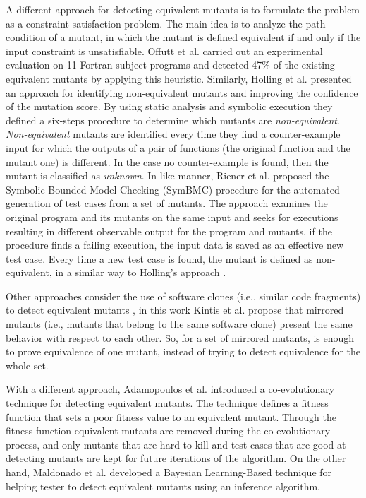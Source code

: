 A different approach for detecting equivalent mutants is to formulate the problem as a constraint satisfaction problem. The main idea is to analyze the path condition of a mutant, in which the mutant is defined equivalent if and only if the input constraint is unsatisfiable. Offutt et al. \cite{offutt1996detecting,offutt1997automatically} carried out an experimental evaluation on 11 Fortran subject programs and detected 47\% of the existing equivalent mutants by applying this heuristic.
Similarly, Holling et al. \cite{holling2016nequivack,papadakis2012mutation} presented an approach for identifying non-equivalent mutants and improving the confidence of the mutation score. By using static analysis and symbolic execution they defined a six-steps procedure to determine which mutants are \textit{non-equivalent}. \textit{Non-equivalent} mutants are identified every time they find a counter-example input for which the outputs of a pair of functions (the original function and the mutant one) is different. In the case no counter-example is found, then the mutant is classified as \textit{unknown}. 
In like manner, Riener et al. \cite{riener2011test} proposed the Symbolic Bounded Model Checking (SymBMC) procedure for the automated generation of test cases from a set of mutants. The approach examines the original program and its mutants on the same input and seeks for executions resulting in different observable output for the program and mutants, if the procedure finds a failing execution, the input data is saved as an effective new test case. Every time a new test case is found, the mutant is defined as non-equivalent, in a similar way to Holling's approach \cite{holling2016nequivack}.

Other approaches consider the use of software clones (i.e., similar code fragments) to detect equivalent mutants \cite{kintis2013identifying}, in this work Kintis et al. propose that mirrored mutants (i.e., mutants that belong to the same software clone) present the same behavior with respect to each other. So, for a set of mirrored mutants, is enough to prove equivalence of one mutant, instead of trying to detect equivalence for the whole set.

With a different approach, Adamopoulos et al. \cite{adamopoulos2004overcome} introduced a co-evolutionary technique for detecting equivalent mutants. The technique defines a fitness function that sets a poor fitness value to an equivalent mutant. Through the fitness function equivalent mutants are removed during the co-evolutionary process, and only mutants that are hard to kill and test cases that are good at detecting mutants are kept for future iterations of the algorithm. On the other hand, Maldonado et al. \cite{maldonado2005bayesian} developed a Bayesian Learning-Based technique for helping tester to detect equivalent mutants using an inference algorithm.

